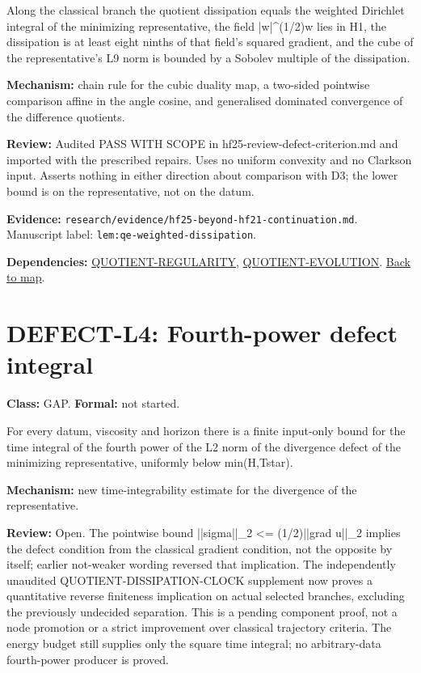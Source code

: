 \documentclass[10pt]{article}
\begin{document}
Along the classical branch the quotient dissipation equals the weighted Dirichlet integral of the minimizing representative, the field |w|\textasciicircum{}(1/2)w lies in H1, the dissipation is at least eight ninths of that field's squared gradient, and the cube of the representative's L9 norm is bounded by a Sobolev multiple of the dissipation.

\textbf{Mechanism:} chain rule for the cubic duality map, a two-sided pointwise comparison affine in the angle cosine, and generalised dominated convergence of the difference quotients.

\textbf{Review:} Audited PASS WITH SCOPE in hf25-review-defect-criterion.md and imported with the prescribed repairs. Uses no uniform convexity and no Clarkson input. Asserts nothing in either direction about comparison with D3; the lower bound is on the representative, not on the datum.

\textbf{Evidence:} \texttt{research/evidence/hf25-beyond-hf21-continuation.md}. Manuscript label: \texttt{lem:qe-weighted-dissipation}.

\textbf{Dependencies:} \hyperref[node:QUOTIENT-REGULARITY]{QUOTIENT-REGULARITY}, \hyperref[node:QUOTIENT-EVOLUTION]{QUOTIENT-EVOLUTION}. \hyperref[map]{Back to map}.

\section*{DEFECT-L4: Fourth-power defect integral}\label{node:DEFECT-L4}
\textbf{Class:} GAP. \textbf{Formal:} not started.

For every datum, viscosity and horizon there is a finite input-only bound for the time integral of the fourth power of the L2 norm of the divergence defect of the minimizing representative, uniformly below min(H,Tstar).

\textbf{Mechanism:} new time-integrability estimate for the divergence of the representative.

\textbf{Review:} Open. The pointwise bound ||sigma||\_2 <= (1/2)||grad u||\_2 implies the defect condition from the classical gradient condition, not the opposite by itself; earlier not-weaker wording reversed that implication. The independently unaudited QUOTIENT-DISSIPATION-CLOCK supplement now proves a quantitative reverse finiteness implication on actual selected branches, excluding the previously undecided separation. This is a pending component proof, not a node promotion or a strict improvement over classical trajectory criteria. The energy budget still supplies only the square time integral; no arbitrary-data fourth-power producer is proved.
\end{document}
